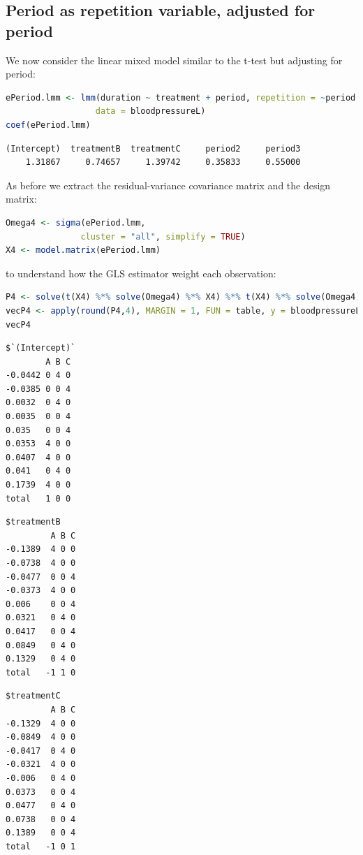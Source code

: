 \documentclass[12pt]{article}
\begin{document}
\clearpage
\subsection{Period as repetition variable, adjusted for period}
\label{SM:lmm2average4}
We now consider the linear mixed model similar to the t-test but
adjusting for period:
\begin{lstlisting}[language=r,numbers=none]
ePeriod.lmm <- lmm(duration ~ treatment + period, repetition = ~period|id,
                  data = bloodpressureL)
coef(ePeriod.lmm)
\end{lstlisting}

\label{}
\begin{verbatim}
(Intercept)  treatmentB  treatmentC     period2     period3 
    1.31867     0.74657     1.39742     0.35833     0.55000
\end{verbatim}


As before we extract the residual-variance covariance matrix and the
design matrix:
\begin{lstlisting}[language=r,numbers=none]
Omega4 <- sigma(ePeriod.lmm,
               cluster = "all", simplify = TRUE)
X4 <- model.matrix(ePeriod.lmm)
\end{lstlisting}

\noindent to understand how the GLS estimator weight each observation:

\begin{lstlisting}[language=r,numbers=none]
P4 <- solve(t(X4) %*% solve(Omega4) %*% X4) %*% t(X4) %*% solve(Omega4)
vecP4 <- apply(round(P4,4), MARGIN = 1, FUN = table, y = bloodpressureL$treatment)
vecP4
\end{lstlisting}

\begin{minipage}{0.3\linewidth}
\label{}
\begin{verbatim}
$`(Intercept)`
        A B C
-0.0442 0 4 0
-0.0385 0 0 4
0.0032  0 4 0
0.0035  0 0 4
0.035   0 0 4
0.0353  4 0 0
0.0407  4 0 0
0.041   0 4 0
0.1739  4 0 0
total   1 0 0
\end{verbatim}

\end{minipage}
\begin{minipage}{0.3\linewidth}
\label{}
\begin{verbatim}
$treatmentB
         A B C
-0.1389  4 0 0
-0.0738  4 0 0
-0.0477  0 0 4
-0.0373  4 0 0
0.006    0 0 4
0.0321   0 4 0
0.0417   0 0 4
0.0849   0 4 0
0.1329   0 4 0
total   -1 1 0
\end{verbatim}
\end{minipage}
\begin{minipage}{0.3\linewidth}
\label{}
\begin{verbatim}
$treatmentC
         A B C
-0.1329  4 0 0
-0.0849  4 0 0
-0.0417  0 4 0
-0.0321  4 0 0
-0.006   0 4 0
0.0373   0 0 4
0.0477   0 4 0
0.0738   0 0 4
0.1389   0 0 4
total   -1 0 1
\end{verbatim}
\end{minipage}
\end{document}
